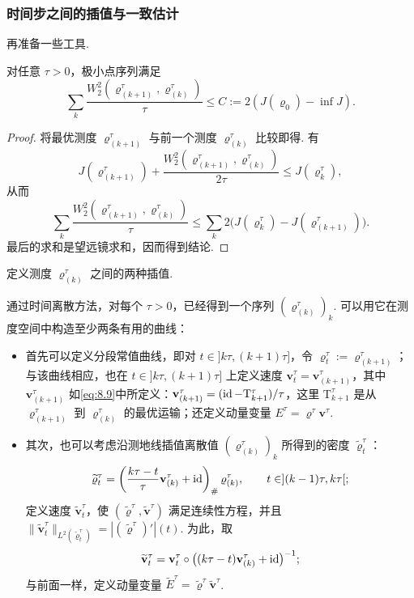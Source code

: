 \subsubsection*{时间步之间的插值与一致估计}
再准备一些工具.
\begin{proposition}\label{obj:8.8}
对任意 $\tau>0$，极小点序列满足
\[
\sum_k\frac{W_2^2(\varrho_{(k+1)}^\tau,\varrho_{(k)}^\tau)}\tau
\leq C:=2(J(\varrho_0)-\inf J).
\]
\end{proposition}
\begin{proof}
将最优测度 $\varrho_{(k+1)}^\tau$ 与前一个测度 $\varrho_{(k)}^\tau$ 比较即得. 有
\begin{equation}\label{eq:8.10}
J(\varrho_{(k+1)}^\tau)+\frac{W_2^2(\varrho_{(k+1)}^\tau,\varrho_{(k)}^\tau)}{2\tau}
\leq J(\varrho_k^\tau),
\end{equation}
从而
\[
\sum_k\frac{W_2^2(\varrho_{(k+1)}^\tau,\varrho_{(k)}^\tau)}\tau
\leq\sum_k2\bigl(J(\varrho_k^\tau)-J(\varrho_{(k+1)}^\tau)\bigr).
\]
最后的求和是望远镜求和，因而得到结论.
\end{proof}

定义测度 $\varrho_{(k)}^\tau$ 之间的两种插值.

通过时间离散方法，对每个 $\tau>0$，已经得到一个序列 $(\varrho_{(k)}^\tau)_k$. 可以用它在测度空间中构造至少两条有用的曲线：
\begin{itemize}
\item 首先可以定义分段常值曲线，即对 $t\in ]k\tau,(k+1)\tau]$，令 $\varrho_t^\tau:=\varrho_{(k+1)}^\tau$；与该曲线相应，也在 $t\in ]k\tau,(k+1)\tau]$ 上定义速度 $\mathbf v_t^\tau=\mathbf v_{(k+1)}^\tau$，其中 $\mathbf v_{(k+1)}^\tau$ 如\eqref{eq:8.9}中所定义：$\mathbf v_{(k+1)}^\tau=(\operatorname{id}-\mathrm T_{k+1}^\tau)/\tau$，这里 $\mathrm T_{k+1}^\tau$ 是从 $\varrho_{(k+1)}^\tau$ 到 $\varrho_{(k)}^\tau$ 的最优运输；还定义动量变量 $E^\tau=\varrho^\tau\mathbf v^\tau$.
\item 其次，也可以考虑沿测地线插值离散值 $(\varrho_{(k)}^\tau)_k$ 所得到的密度 $\widetilde\varrho_t^\tau$：
\begin{equation}\label{eq:8.11}\index{G065@测地线（geodesics）!066@$\mathbb W_p$中（in $\mathbb W_p$）|hyperpage}
\widetilde\varrho_t^\tau=\left(\frac{k\tau-t}\tau\mathbf v_{(k)}^\tau+\id\right)_\#\varrho_{(k)}^\tau,
\qquad t\in ](k-1)\tau,k\tau[;
\end{equation}
定义速度 $\widetilde{\mathbf v}_t^\tau$，使 $(\widetilde\varrho^\tau,\widetilde{\mathbf v}^\tau)$ 满足连续性方程，并且 $\|\widetilde{\mathbf v}_t^\tau\|_{L^2(\widetilde\varrho_t^\tau)}=|(\widetilde\varrho^\tau)'|(t)$. 为此，取
\[
\widetilde{\mathbf v}_t^\tau=\mathbf v_t^\tau\circ\bigl((k\tau-t)\mathbf v_{(k)}^\tau+\operatorname{id}\bigr)^{-1};
\]
与前面一样，定义动量变量 $\widetilde E^\tau=\widetilde\varrho^\tau\widetilde{\mathbf v}^\tau$.
\end{itemize}

